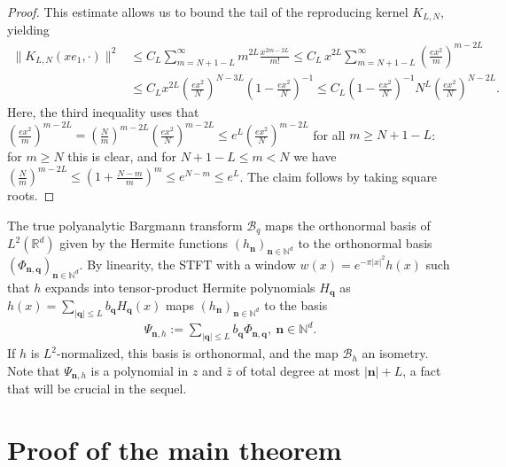 \documentclass[11pt]{amsart}
\begin{document}
\begin{proof}
    This estimate allows us to bound the tail of the reproducing kernel $K_{L,N}$, yielding
    \begin{align*}
        \| K_{L,N}(x e_1,\cdot) \|^2 &\leq C_{L} \sum_{m=N+1-L}^{\infty} m^{2L} \frac{x^{2m-2L}}{m!} \leq C_L \, x^{2L} \sum_{m=N+1-L}^{\infty} \left( \frac{ex^2}{m} \right)^{m-2L} \\
        &\leq C_L x^{2L} \left( \frac{ex^2}{N} \right)^{N-3L} \left( 1 - \frac{ex^2}{N}\right)^{-1} \leq C_L  \left( 1 - \frac{ex^2}{N}\right)^{-1} N^{L} \left( \frac{ex^2}{N} \right)^{N-2L}.
    \end{align*}
    Here, the third inequality uses that $\left(\frac{ex^2}{m}\right)^{m-2L} = \left(\frac{N}{m}\right)^{m-2L}\left(\frac{ex^2}{N}\right)^{m-2L} \leq e^{L}\left(\frac{ex^2}{N}\right)^{m-2L}$ for all $m \geq N+1-L$: for $m \geq N$ this is clear, and for $N+1-L \leq m < N$ we have $\left(\frac Nm\right)^{m-2L} \leq \left(1 + \frac{N-m}{m}\right)^{m} \leq e^{N-m} \leq e^{L}$. The claim follows by taking square roots.
    \end{proof}

    The true polyanalytic Bargmann transform $\mathcal B_q$ maps the orthonormal basis of $L^2(\mathbb R^d)$ given by the Hermite functions $(h_{\mathbf n})_{\mathbf n \in \mathbb N^d}$ to the orthonormal basis $(\Phi_{\mathbf n, \mathbf q})_{\mathbf n \in \mathbb N^d}$. By linearity, the STFT with a window $w(x) = e^{-\pi |x|^2} h(x)$ such that $h$ expands into tensor-product Hermite polynomials $H_{\mathbf q}$ as $h(x) = \sum_{|\mathbf q| \leq L} b_{\mathbf q} H_{\mathbf q}(x)$ maps $(h_{\mathbf n})_{\mathbf n \in \mathbb N^d}$ to the basis 
    \begin{align*}
        \Psi_{\mathbf n, h} := \sum_{|\mathbf q| \leq L} b_{\mathbf q} \Phi_{\mathbf n, \mathbf q}, \ \mathbf n \in \mathbb N^d.
    \end{align*}
    If $h$ is $L^2$-normalized, this basis is orthonormal, and the map $\mathcal B_h$ an isometry. Note that $\Psi_{\mathbf n,h}$ is a polynomial in $z$ and $\bar z$ of total degree at most $|\mathbf n| + L$, a fact that will be crucial in the sequel.

\section{Proof of the main theorem}\label{sec:main_proof}
\end{document}
